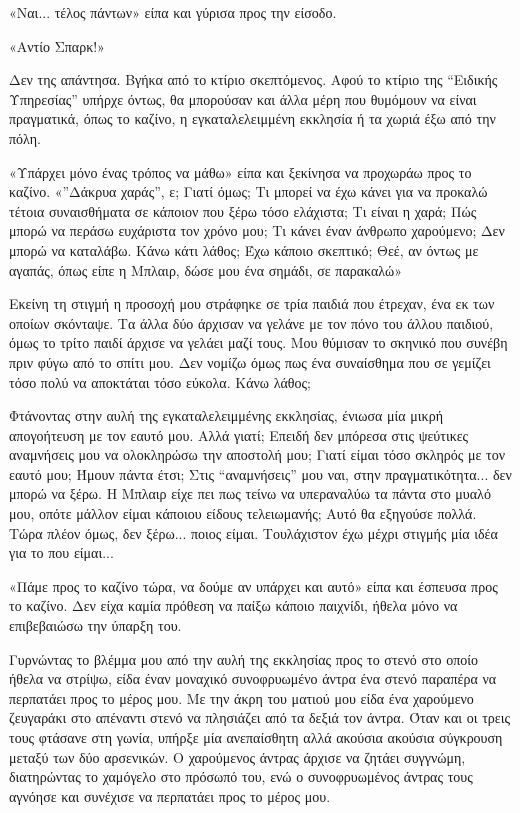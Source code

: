 \documentclass[12pt,twoside, openany]{book}
\begin{document}
«Ναι... τέλος πάντων» είπα και γύρισα προς την είσοδο.

«Αντίο Σπαρκ!»

Δεν της απάντησα. Βγήκα από το κτίριο σκεπτόμενος. Αφού το κτίριο της “Ειδικής Υπηρεσίας” υπήρχε όντως, θα μπορούσαν και άλλα μέρη που θυμόμουν να είναι πραγματικά, όπως το καζίνο, η εγκαταλελειμμένη εκκλησία ή τα χωριά έξω από την πόλη.

«Υπάρχει μόνο ένας τρόπος να μάθω» είπα και ξεκίνησα να προχωράω προς το καζίνο. «”Δάκρυα χαράς”, ε; Γιατί όμως; Τι μπορεί να έχω κάνει για να προκαλώ τέτοια συναισθήματα σε κάποιον που ξέρω τόσο ελάχιστα; Τι είναι η χαρά; Πώς μπορώ να περάσω ευχάριστα τον χρόνο μου; Τι κάνει έναν άνθρωπο χαρούμενο; Δεν μπορώ να καταλάβω. Κάνω κάτι λάθος; Έχω κάποιο σκεπτικό; Θεέ, αν όντως με αγαπάς, όπως είπε η Μπλαιρ, δώσε μου ένα σημάδι, σε παρακαλώ»

Εκείνη τη στιγμή η προσοχή μου στράφηκε σε τρία παιδιά που έτρεχαν, ένα εκ των οποίων σκόνταψε. Τα άλλα δύο άρχισαν να γελάνε με τον πόνο του άλλου παιδιού, όμως το τρίτο παιδί άρχισε να γελάει μαζί τους. Μου θύμισαν το σκηνικό που συνέβη πριν φύγω από το σπίτι μου. Δεν νομίζω όμως πως ένα συναίσθημα που σε γεμίζει τόσο πολύ να αποκτάται τόσο εύκολα. Κάνω λάθος;

Φτάνοντας στην αυλή της εγκαταλελειμμένης εκκλησίας, ένιωσα μία μικρή απογοήτευση με τον εαυτό μου. Αλλά γιατί; Επειδή δεν μπόρεσα στις ψεύτικες αναμνήσεις μου να ολοκληρώσω την αποστολή μου; Γιατί είμαι τόσο σκληρός με τον εαυτό μου; Ήμουν πάντα έτσι; Στις “αναμνήσεις” μου ναι, στην πραγματικότητα... δεν μπορώ να ξέρω. Η Μπλαιρ είχε πει πως τείνω να υπεραναλύω τα πάντα στο μυαλό μου, οπότε μάλλον είμαι κάποιου είδους τελειωμανής; Αυτό θα εξηγούσε πολλά. Τώρα πλέον όμως, δεν ξέρω... ποιος είμαι. Τουλάχιστον έχω μέχρι στιγμής μία ιδέα για το που είμαι...

«Πάμε προς το καζίνο τώρα, να δούμε αν υπάρχει και αυτό» είπα και έσπευσα προς το καζίνο. Δεν είχα καμία πρόθεση να παίξω κάποιο παιχνίδι, ήθελα μόνο να επιβεβαιώσω την ύπαρξη του.

Γυρνώντας το βλέμμα μου από την αυλή της εκκλησίας προς το στενό στο οποίο ήθελα να στρίψω, είδα έναν μοναχικό συνοφρυωμένο άντρα ένα στενό παραπέρα να περπατάει προς το μέρος μου. Με την άκρη του ματιού μου είδα ένα χαρούμενο ζευγαράκι στο απέναντι στενό να πλησιάζει από τα δεξιά τον άντρα. Όταν και οι τρεις τους φτάσανε στη γωνία, υπήρξε μία ανεπαίσθητη αλλά ακούσια ακούσια σύγκρουση μεταξύ των δύο αρσενικών. Ο χαρούμενος άντρας άρχισε να ζητάει συγγνώμη, διατηρώντας το χαμόγελο στο πρόσωπό του, ενώ ο συνοφρυωμένος άντρας τους αγνόησε και συνέχισε να περπατάει προς το μέρος μου.
\end{document}
